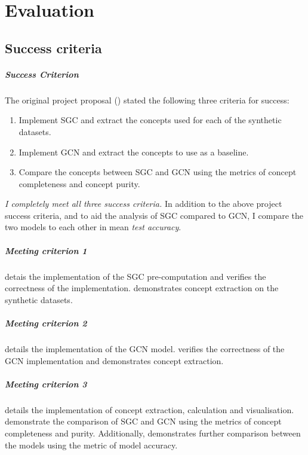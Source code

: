 \chapter{Evaluation}

\section{Success criteria}

\paragraph{Success Criterion}
The original project proposal () stated the following three criteria for success:
\begin{enumerate}
    \item 
        Implement SGC and extract the concepts used for each of the synthetic datasets.
        \label{crit1}
    \item 
        Implement GCN and extract the concepts to use as a baseline.
        \label{crit2}
    \item 
        Compare the concepts between SGC and GCN using the metrics of concept completeness and concept purity.
        \label{crit3}
\end{enumerate}

\emph{I completely meet all three success criteria.}
In addition to the above project success criteria, and to aid the analysis of SGC compared to GCN, 
I compare the two models to each other in mean \emph{test accuracy}.

\paragraph{Meeting criterion 1}
 detais the implementation of the SGC pre-computation and  verifies the correctness of the implementation.
 demonstrates concept extraction on the synthetic datasets.

\paragraph{Meeting criterion 2}
 details the implementation of the GCN model.
 verifies the correctness of the GCN implementation and demonstrates concept extraction.

\paragraph{Meeting criterion 3}
 details the implementation of concept extraction, calculation and visualisation.
 demonstrate the comparison of SGC and GCN using the metrics of concept completeness and purity.
Additionally,  demonstrates further comparison between the models using the metric of model accuracy.

